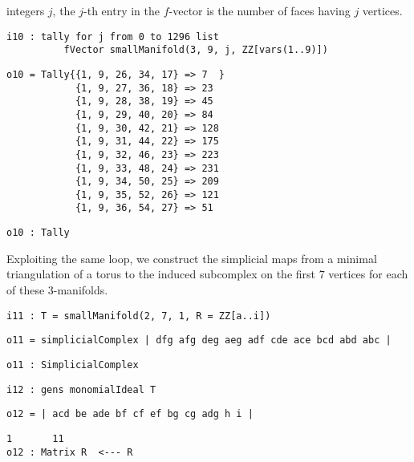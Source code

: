 \documentclass[12pt,leqno]{amsart}
\theoremstyle{definition}
\begin{document}
integers $j$, the $j$-th entry in the $f\!$-vector is the number of faces having
$j$ vertices.
\begin{lstlisting}[xleftmargin=10pt, lineskip=-5pt, aboveskip=3.0pt, belowskip=1.5pt]
i10 : tally for j from 0 to 1296 list 
          fVector smallManifold(3, 9, j, ZZ[vars(1..9)])
\end{lstlisting}
\begin{lstlisting}[xleftmargin=10pt, lineskip=-5pt, aboveskip=4pt, belowskip=1.5pt]
o10 = Tally{{1, 9, 26, 34, 17} => 7  }
            {1, 9, 27, 36, 18} => 23
            {1, 9, 28, 38, 19} => 45
            {1, 9, 29, 40, 20} => 84
            {1, 9, 30, 42, 21} => 128
            {1, 9, 31, 44, 22} => 175
            {1, 9, 32, 46, 23} => 223
            {1, 9, 33, 48, 24} => 231
            {1, 9, 34, 50, 25} => 209
            {1, 9, 35, 52, 26} => 121
            {1, 9, 36, 54, 27} => 51
\end{lstlisting}
\begin{lstlisting}[xleftmargin=10pt, aboveskip=-5pt, belowskip=3.0pt]
o10 : Tally
\end{lstlisting}
Exploiting the same loop, we construct the simplicial maps from a minimal
triangulation of a torus to the induced subcomplex on the first $7$ vertices
for each of these $3$-manifolds.
\begin{lstlisting}[xleftmargin=10pt, aboveskip=3.0pt, belowskip=1.5pt]
i11 : T = smallManifold(2, 7, 1, R = ZZ[a..i])
\end{lstlisting}
\begin{lstlisting}[xleftmargin=10pt, aboveskip=1.5pt, belowskip=1.5pt]
o11 = simplicialComplex | dfg afg deg aeg adf cde ace bcd abd abc |
\end{lstlisting}
\begin{lstlisting}[xleftmargin=10pt, aboveskip=1.5pt, belowskip=1.5pt]
o11 : SimplicialComplex
\end{lstlisting}
\begin{lstlisting}[xleftmargin=10pt, aboveskip=1.5pt, belowskip=1.5pt]
i12 : gens monomialIdeal T
\end{lstlisting}
\begin{lstlisting}[xleftmargin=10pt, aboveskip=1.5pt, belowskip=1.5pt]
o12 = | acd be ade bf cf ef bg cg adg h i |
\end{lstlisting}
\begin{lstlisting}[xleftmargin=10pt, lineskip=-10pt, aboveskip=4pt, belowskip=1.5pt]
              1       11
o12 : Matrix R  <--- R
\end{lstlisting}
\end{document}
